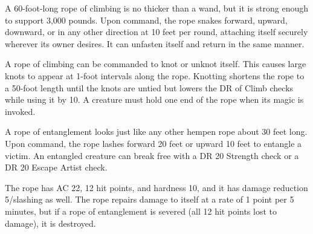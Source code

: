 {\begin{comment}
If a white robe is donned by an evil character, she immediately gains three negative levels. The reverse is true with respect to a black robe donned by a good character. An evil or good character who puts on a gray robe, or a neutral character who dons either a white or black robe, gains two negative levels. While these negative levels never result in lost levels, they remain as long as the garment is worn and cannot be overcome in any way (including restoration spells).

Strong varied; CL 14th; Craft Wondrous Item, antimagic field, mage armor or shield of faith, creator must be of same alignment as robe; Price 75,000 gp;Weight 1 lb.
\end{comment}

 A 60-foot-long rope of climbing is no thicker than a wand, but it is strong enough to support 3,000 pounds. Upon command, the rope snakes forward, upward, downward, or in any other direction at 10 feet per round, attaching itself securely wherever its owner desires. It can unfasten itself and return in the same manner.

A rope of climbing can be commanded to knot or unknot itself. This causes large knots to appear at 1-foot intervals along the rope. Knotting shortens the rope to a 50-foot length until the knots are untied but lowers the DR of Climb checks while using it by 10. A creature must hold one end of the rope when its magic is invoked.


 A rope of entanglement looks just like any other hempen rope about 30 feet long. Upon command, the rope lashes forward 20 feet or upward 10 feet to entangle a victim.  An entangled creature can break free with a DR 20 Strength check or a DR 20 Escape Artist check.

The rope has AC 22, 12 hit points, and hardness 10, and it has damage reduction 5/slashing as well. The rope repairs damage to itself at a rate of 1 point per 5 minutes, but if a rope of entanglement is severed (all 12 hit points lost to damage), it is destroyed.

}
